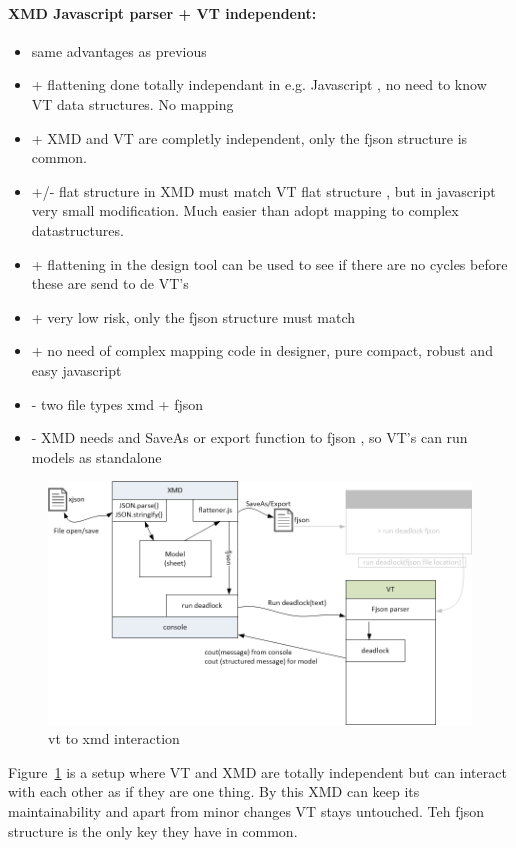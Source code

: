 \documentclass[a4paper,11pt,final]{article}
\begin{document}
\paragraph{XMD Javascript parser + VT independent:}
\begin{itemize}
\item same advantages as previous
\item + flattening done totally independant in e.g. Javascript , no need to know VT data structures.  No mapping
\item + XMD and VT are completly independent, only the fjson structure is common.
\item +/- flat structure in XMD must match VT flat structure , but in javascript
	very small modification. Much easier than adopt mapping to complex datastructures.
\item + flattening in the design tool can be used to see if there are no cycles before these are send to de VT’s
\item + very low risk, only the fjson structure must match
\item + no need of complex mapping code in designer, pure compact, robust and easy javascript
\item - two file types xmd + fjson
\item - XMD needs and SaveAs or export function to fjson , so VT’s can run models as standalone
\end{itemize}


\begin{figure}[here]
\includegraphics[width=1.0\textwidth]{xmd2vt}
\caption{vt to xmd interaction}
\label{fig:xmd2vt}
\end{figure}
Figure~\ref{fig:xmd2vt} is a setup where VT and XMD are totally independent
but can interact with each other as if they are one thing. By this XMD can keep
its maintainability and apart from minor changes VT stays untouched.
Teh fjson structure is the only key they have in common.
\end{document}
